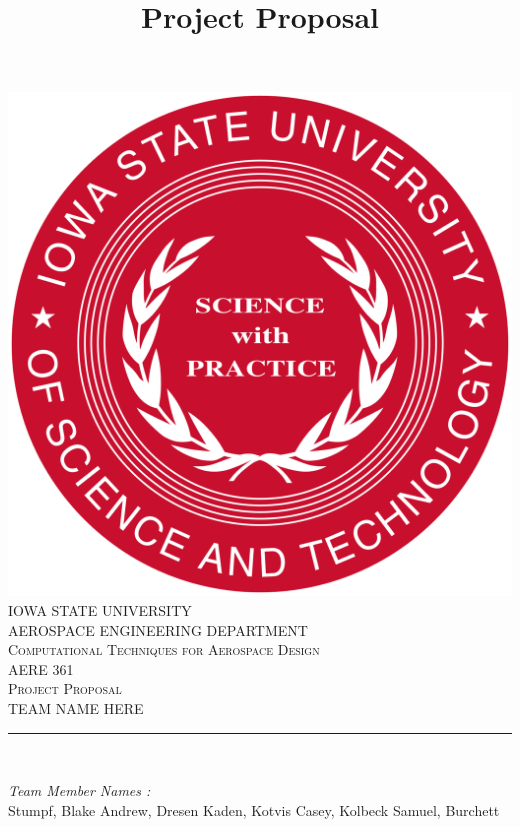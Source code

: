 \documentclass[12pt]{article}
\begin{document}
\title{Project Proposal}

\begin{titlepage}
	\centering
    \vspace*{0.5 cm}
    \includegraphics[scale = 0.11]{isu_seal.png}\\[1.0 cm]	%
    \textsc{\LARGE IOWA STATE UNIVERSITY}\\[2.0 cm]
    \textsc{\large AEROSPACE ENGINEERING DEPARTMENT}\\[0.2 cm]
    \textsc{\large Computational Techniques for Aerospace Design}\\[0.2 cm]
	\textsc{\Large AERE 361}\\[0.5 cm]				%
	\textsc{\Large Project Proposal}\\[0.2 cm]
	\textsc{\Large TEAM NAME HERE}\\[0.2 cm]
	\rule{\linewidth}{0.2 mm} \\[0.4 cm]
	
	
	\begin{minipage}{0.8\textwidth}
		
			\begin{flushleft} 
			\emph{Team Member Names :} \\
			Stumpf, Blake\linebreak
			Andrew, Dresen\linebreak
			Kaden, Kotvis\linebreak
			Casey, Kolbeck\linebreak
			Samuel, Burchett\linebreak
			
		\end{flushleft}
	\end{minipage}\\[2 cm]
	
	\vfill
	
\end{titlepage}
\end{document}
